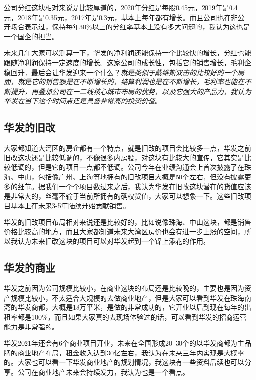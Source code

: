 \documentclass[a4paper,12pt,lang=cn,fontset = windows]{elegantpaper} %
\begin{document}
公司分红这块相对来说是比较厚道的，2020年分红是每股0.45元，2019年是0.4元，2018年是0.35元，2017年是0.3元，基本上每年都有增长。而且公司也在非公开场合表示过，保持每年30\%以上的分红率基本上没有多大问题的，我认为这也是一个国企的担当。

未来几年大家可以测算一下，华发的净利润还能保持一个比较快的增长，分红也能跟随净利润保持一定速度的增长。这家公司的成长性，包括它的销售增长，毛利企稳回升，最后会让华发迎来一个什么？\emph{就是类似于戴维斯双击的比较好的一个局面，就是它的销售额是在不断增长的，结算利润也是在不断增长，毛利率也能在不断提升，再叠加公司在一二线核心城市布局的优势，以及它强大的产品力，我认为华发在当下这个时间点还是具备非常高的投资价值}。



\subsection{华发的旧改}

大家都知道大湾区的房企都有一个特点，就是旧改的项目会比较多一点，华发之前旧改这块还是比较低调的，不像很多内房股，对这块有比较大的宣传，它其实是比较低调的，但是它的项目一点都不低调。公司今年在业绩沟通会上首次披露了在珠海、中山，包括像广州、上海等地拥有的旧改项目大概是50个左右，但没有披露更多的细节。据我们一个个项目数过来之后，我认为华发在旧改这块潜在的货值应该是非常大的，丝毫不输于当前所拥有的确权货值，大家可以想象一下。这些旧改项目基本上在未来3-5年陆续开始贡献销售。

华发的旧改项目布局相对来说还是比较好的，比如说像珠海、中山这块，都是销售价格比较高的地方，而且大家都知道未来大湾区房价也会有进一步上涨的空间，所以我认为未来旧改这块的项目可以对华发起到一个锦上添花的作用。



\subsection{华发的商业}

华发之前因为公司规模比较小，在商业这块的布局还是比较晚的，主要也是因为资产规模比较小，不太适合大规模的去做商业地产，但是大家可以看到华发在珠海南湾的华发商都，大概是18万平米，是做的非常成功的，它开业以后到现在每年的出租率都是100\%，而且如果大家真的去现场体验过的话，可以看到华发的招商运营能力是非常强的。

华发2021年还会有6个商业项目开业，未来在全国形成20~30个的以华发商都为主品牌的商业地产布局，租金收入达到30亿左右，我认为在未来三年内实现是大概率的。大家也可以看一下华发商业地产的规划情况，我这块有一些资料后续也可以分享。公司在商业地产未来会持续发力，我认为也是一个看点。
\end{document}
